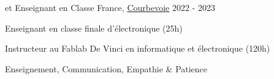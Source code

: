 \begin{cventries}
	\cventry
	{\esilv et \emlv} %
	{Enseignant en Classe} %
	{France, \href{https://www.ville-courbevoie.fr/}{Courbevoie}} %
	{2022 - 2023} %
	{
		\begin{cvitems} %
			\item {Enseignant en classe finale d'électronique (25h)}
			\item {Instructeur au Fablab De Vinci en informatique et électronique (120h)}
		\end{cvitems}
	}
	{
		\begin{cvitemsskills} %
			\item {Enseignement, Communication, Empathie \& Patience}
		\end{cvitemsskills}
	}

\end{cventries}

